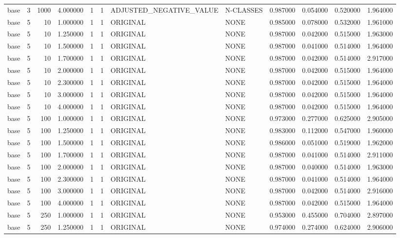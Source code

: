 \begin{tabular}{lrrrllllrrrr}
base & 3 & 1000 & 4.000000 & 1 & 1 & ADJUSTED_NEGATIVE_VALUE & N-CLASSES & 0.987000 & 0.054000 & 0.520000 & 1.964000 \\
base & 5 & 10 & 1.000000 & 1 & 1 & ORIGINAL & NONE & 0.985000 & 0.078000 & 0.532000 & 1.961000 \\
base & 5 & 10 & 1.250000 & 1 & 1 & ORIGINAL & NONE & 0.987000 & 0.042000 & 0.515000 & 1.963000 \\
base & 5 & 10 & 1.500000 & 1 & 1 & ORIGINAL & NONE & 0.987000 & 0.041000 & 0.514000 & 1.964000 \\
base & 5 & 10 & 1.700000 & 1 & 1 & ORIGINAL & NONE & 0.987000 & 0.042000 & 0.514000 & 2.917000 \\
base & 5 & 10 & 2.000000 & 1 & 1 & ORIGINAL & NONE & 0.987000 & 0.042000 & 0.515000 & 1.964000 \\
base & 5 & 10 & 2.300000 & 1 & 1 & ORIGINAL & NONE & 0.987000 & 0.042000 & 0.515000 & 1.964000 \\
base & 5 & 10 & 3.000000 & 1 & 1 & ORIGINAL & NONE & 0.987000 & 0.042000 & 0.515000 & 1.964000 \\
base & 5 & 10 & 4.000000 & 1 & 1 & ORIGINAL & NONE & 0.987000 & 0.042000 & 0.515000 & 1.964000 \\
base & 5 & 100 & 1.000000 & 1 & 1 & ORIGINAL & NONE & 0.973000 & 0.277000 & 0.625000 & 2.905000 \\
base & 5 & 100 & 1.250000 & 1 & 1 & ORIGINAL & NONE & 0.983000 & 0.112000 & 0.547000 & 1.960000 \\
base & 5 & 100 & 1.500000 & 1 & 1 & ORIGINAL & NONE & 0.986000 & 0.051000 & 0.519000 & 1.962000 \\
base & 5 & 100 & 1.700000 & 1 & 1 & ORIGINAL & NONE & 0.987000 & 0.041000 & 0.514000 & 2.911000 \\
base & 5 & 100 & 2.000000 & 1 & 1 & ORIGINAL & NONE & 0.987000 & 0.040000 & 0.514000 & 1.963000 \\
base & 5 & 100 & 2.300000 & 1 & 1 & ORIGINAL & NONE & 0.987000 & 0.041000 & 0.514000 & 1.964000 \\
base & 5 & 100 & 3.000000 & 1 & 1 & ORIGINAL & NONE & 0.987000 & 0.042000 & 0.514000 & 2.916000 \\
base & 5 & 100 & 4.000000 & 1 & 1 & ORIGINAL & NONE & 0.987000 & 0.042000 & 0.515000 & 1.964000 \\
base & 5 & 250 & 1.000000 & 1 & 1 & ORIGINAL & NONE & 0.953000 & 0.455000 & 0.704000 & 2.897000 \\
base & 5 & 250 & 1.250000 & 1 & 1 & ORIGINAL & NONE & 0.974000 & 0.274000 & 0.624000 & 2.906000 \\

\end{tabular}
